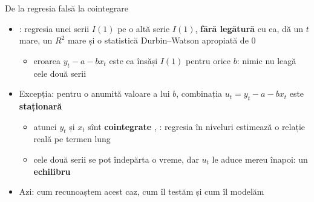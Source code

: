 \begin{frame}{De la regresia falsă la cointegrare}
\itemsize{\small}
\begin{itemize}
    \item {}: regresia unei serii $I(1)$ pe o altă serie $I(1)$, \textbf{fără legătură} cu ea, dă un $t$ mare, un $R^2$ mare și o statistică Durbin--Watson apropiată de 0 
    \begin{itemize}
        \item eroarea $y_t - a - b x_t$ este ea însăși $I(1)$ pentru orice $b$: nimic nu leagă cele două serii
    \end{itemize}
    \item Excepția: pentru o anumită valoare a lui $b$, combinația $u_t = y_t - a - b x_t$ este \textbf{staționară}
    \begin{itemize}
        \item atunci $y_t$ și $x_t$ sînt \textbf{cointegrate} , : regresia în niveluri estimează o relație reală pe termen lung
        \item cele două serii se pot îndepărta o vreme, dar $u_t$ le aduce mereu înapoi: un \textbf{echilibru}
    \end{itemize}
    \item Azi: cum recunoaștem acest caz, cum îl testăm și cum îl modelăm
\end{itemize}
\end{frame}

